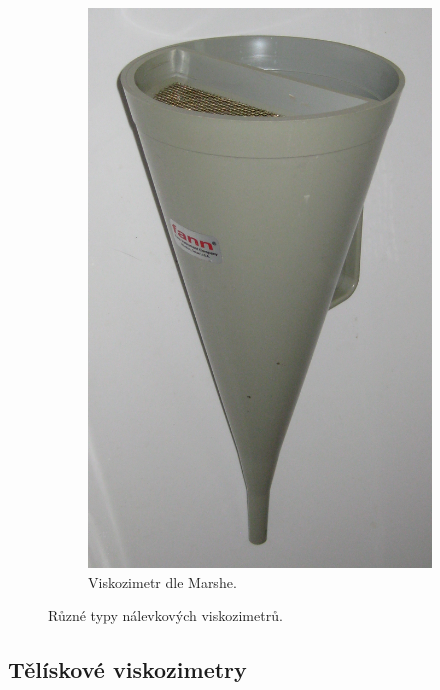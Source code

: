 \documentclass[12pt]{article}
\begin{document}
\begin{figure}
\begin{subfigure}[b]{.3\textwidth}
        \includegraphics[width = \linewidth]{figures/Marsh_funnel.jpg}
        \caption{Viskozimetr dle Marshe.~\cite{Figure:marsh_funnel}}
    \end{subfigure}
    \caption{Různé typy nálevkových viskozimetrů.}
    \label{fig:nalevkove_viskozimetry}
\end{figure}

\subsection{Tělískové viskozimetry}%
\end{document}
